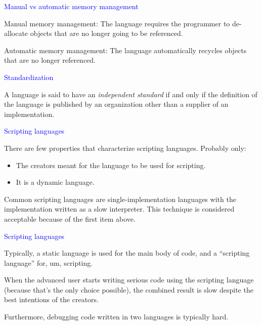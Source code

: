 \documentclass{slides}
\newcommand{\ti}[1]{\begin{center}\Large{\textcolor{blue}{#1}}\end{center}}
\begin{document}
\begin{slide}\ti{Manual vs automatic memory management}

Manual memory management: The language requires the programmer to
de-allocate objects that are no longer going to be referenced.

Automatic memory management: The language automatically recycles
objects that are no longer referenced.

\vfill\end{slide}
\begin{slide}\ti{Standardization}

A language is said to have an \emph{independent standard} if and only
if the definition of the language is published by an organization
other than a supplier of an implementation.

\vfill\end{slide}
\begin{slide}\ti{Scripting languages}

There are few properties that characterize scripting languages.
Probably only:

\begin{itemize}
\item The creators meant for the language to be used for scripting.
\item It is a dynamic language.
\end{itemize}

Common scripting languages are single-implementation languages with
the implementation written as a slow interpreter.  This technique is
considered acceptable because of the first item above.

\vfill\end{slide}
\begin{slide}\ti{Scripting languages}

Typically, a static language is used for the main body of code, and a
``scripting language'' for, um, scripting.

When the advanced user starts writing serious code using the scripting
language (because that's the only choice possible), the combined
result is slow despite the best intentions of the creators.

Furthermore, debugging code written in two languages is typically hard.

\vfill\end{slide}
\end{document}
